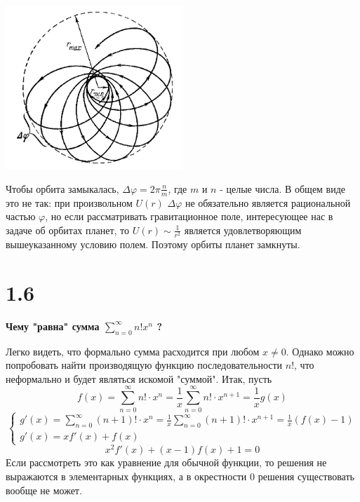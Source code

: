 \documentclass[a4paper,14pt]{article}
\begin{document}
\begin{center}
        \includegraphics[width=0.5\textwidth]{1.jpg}
\end{center}
Чтобы орбита замыкалась, $\Delta \varphi = 2\pi \frac{n}{m}$, где $m$ и $n$ - целые числа. В общем виде это не так: при произвольном $U(r)$ $\Delta \varphi$ не обязательно является рациональной частью $\varphi$, но если рассматривать гравитационное поле, интересующее нас в задаче об орбитах планет, то $U(r) \sim \frac{1}{r^2}$ является удовлетворяющим вышеуказанному условию полем. Поэтому орбиты планет замкнуты.

\section*{1.6}
\begin{center}
	\LARGE{\textbf{Чему "равна" сумма $\sum\limits_{n = 0}^{\infty}  n! x^n$ ?}}\\
\end{center}
Легко видеть, что формально сумма расходится при любом $x\neq0$. Однако можно попробовать найти производящую функцию последовательности $n!$, что неформально и будет являться искомой "суммой". Итак, пусть
$$f(x)=\sum_{n=0}^{\infty}n!\cdot x^n=\frac{1}{x}\sum_{n=0}^{\infty}n!\cdot x^{n+1}=\frac{1}{x}g(x)$$
$$\begin{cases}
g'(x)=\sum_{n=0}^{\infty}(n+1)!\cdot x^n=\frac{1}{x}\sum_{n=0}^{\infty}(n+1)!\cdot x^{n+1}=\frac{1}{x}(f(x)-1)\\
g'(x)=x f'(x)+f(x)
\end{cases}$$
$$x^2 f'(x) + (x-1) f(x) + 1 = 0$$
Если рассмотреть это как уравнение для обычной функции, то решения не выражаются в элементарных функциях, а в окрестности 0 решения существовать вообще не может. 
\end{document}

